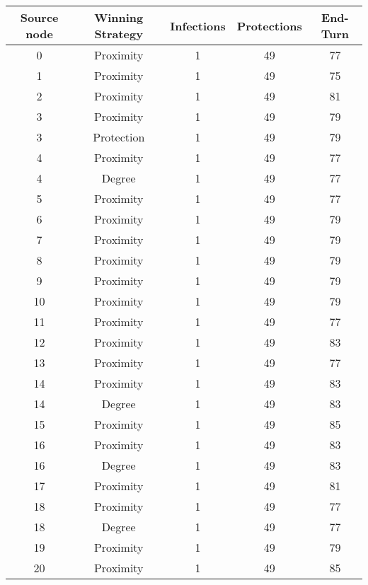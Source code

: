 \documentclass[results.tex]{subfiles}
\begin{document}
\begin{center}
  \begin{tabular}{| c || c | c | c | c |}
    \hline
    {\bfseries Source node} & {\bfseries Winning Strategy} & {\bfseries Infections} & {\bfseries Protections} & {\bfseries End-Turn} \\  %
    \hline\hline
    0 & Proximity & 1 & 49 & 77 \\ 
    \hline
    1 & Proximity & 1 & 49 & 75 \\ 
    \hline
    2 & Proximity & 1 & 49 & 81 \\ 
    \hline
    3 & Proximity & 1 & 49 & 79 \\ 
    \hline
    3 & Protection & 1 & 49 & 79 \\ 
    \hline
    4 & Proximity & 1 & 49 & 77 \\ 
    \hline
    4 & Degree & 1 & 49 & 77 \\ 
    \hline
    5 & Proximity & 1 & 49 & 77 \\ 
    \hline
    6 & Proximity & 1 & 49 & 79 \\ 
    \hline
    7 & Proximity & 1 & 49 & 79 \\ 
    \hline
    8 & Proximity & 1 & 49 & 79 \\ 
    \hline
    9 & Proximity & 1 & 49 & 79 \\ 
    \hline
    10 & Proximity & 1 & 49 & 79 \\ 
    \hline
    11 & Proximity & 1 & 49 & 77 \\ 
    \hline
    12 & Proximity & 1 & 49 & 83 \\ 
    \hline
    13 & Proximity & 1 & 49 & 77 \\ 
    \hline
    14 & Proximity & 1 & 49 & 83 \\ 
    \hline
    14 & Degree & 1 & 49 & 83 \\ 
    \hline
    15 & Proximity & 1 & 49 & 85 \\ 
    \hline
    16 & Proximity & 1 & 49 & 83 \\ 
    \hline
    16 & Degree & 1 & 49 & 83 \\ 
    \hline
    17 & Proximity & 1 & 49 & 81 \\ 
    \hline
    18 & Proximity & 1 & 49 & 77 \\ 
    \hline
    18 & Degree & 1 & 49 & 77 \\ 
    \hline
    19 & Proximity & 1 & 49 & 79 \\ 
    \hline
    20 & Proximity & 1 & 49 & 85 \\ 

\end{tabular}
\end{center}
\end{document}
